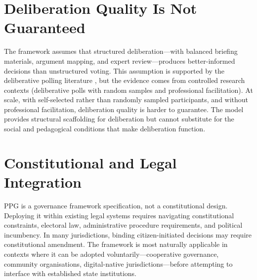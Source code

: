 \documentclass[12pt,a4paper,oneside]{report}
\begin{document}
\section{Deliberation Quality Is Not Guaranteed}

The framework assumes that structured deliberation---with balanced briefing materials, argument mapping, and expert review---produces better-informed decisions than unstructured voting. This assumption is supported by the deliberative polling literature \citep{fishkin2018stanford, dutwin2003character}, but the evidence comes from controlled research contexts (deliberative polls with random samples and professional facilitation). At scale, with self-selected rather than randomly sampled participants, and without professional facilitation, deliberation quality is harder to guarantee. The model provides structural scaffolding for deliberation but cannot substitute for the social and pedagogical conditions that make deliberation function.

\section{Constitutional and Legal Integration}

PPG is a governance framework specification, not a constitutional design. Deploying it within existing legal systems requires navigating constitutional constraints, electoral law, administrative procedure requirements, and political incumbency. In many jurisdictions, binding citizen-initiated decisions may require constitutional amendment. The framework is most naturally applicable in contexts where it can be adopted voluntarily---cooperative governance, community organisations, digital-native jurisdictions---before attempting to interface with established state institutions.
\end{document}

